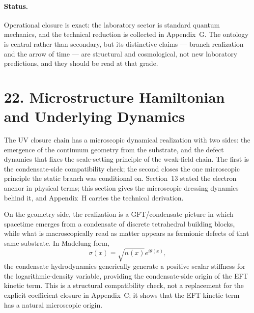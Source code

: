 \documentclass[11pt]{article}
\begin{document}
\paragraph{Status.}
Operational closure is exact: the laboratory sector is standard quantum mechanics, and the technical reduction is collected in Appendix~G. The ontology is central rather than secondary, but its distinctive claims --- branch realization and the arrow of time --- are structural and cosmological, not new laboratory predictions, and they should be read at that grade.

\section{22. Microstructure Hamiltonian and Underlying Dynamics}

The UV closure chain has a microscopic dynamical realization with two sides: the emergence of the continuum geometry from the substrate, and the defect dynamics that fixes the scale-setting principle of the weak-field chain. The first is the condensate-side compatibility check; the second closes the one microscopic principle the static branch was conditional on. Section~13 stated the electron anchor in physical terms; this section gives the microscopic dressing dynamics behind it, and Appendix~H carries the technical derivation.

On the geometry side, the realization is a GFT/condensate picture \citep{Oriti2016,Gielen2013} in which spacetime emerges from a condensate of discrete tetrahedral building blocks, while what is macroscopically read as matter appears as fermionic defects of that same substrate. In Madelung form,
\[
\sigma(x)=\sqrt{n(x)}e^{i\theta(x)},
\]
the condensate hydrodynamics generically generate a positive scalar stiffness for the logarithmic-density variable, providing the condensate-side origin of the EFT kinetic term. This is a structural compatibility check, not a replacement for the explicit coefficient closure in Appendix~C; it shows that the EFT kinetic term has a natural microscopic origin.
\end{document}
